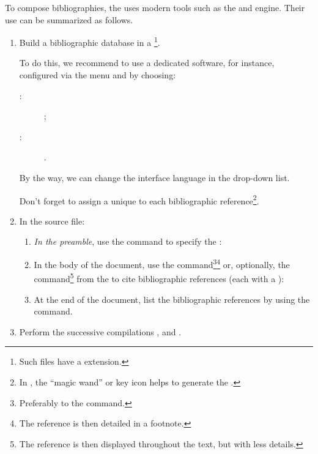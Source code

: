 \documentclass[english,nolocaltoc]{nwejmart}
\newtheorem[style=definition]{fact}
\newtheorem[title-plural=Criteria]{criterion}
\newtheorem[title=random experiment]{rexp}
\begin{document}
To compose bibliographies, the \nwejmauthorcl{} uses modern tools such
as the  and   engine. Their use can
be summarized as follows\autocite[for more details, see e.g.][in French]{Bitouze}.
\begin{enumerate}
\item Build a bibliographic database in a \footnote{Such
    files have a  extension.}.

  To do this, we recommend to use a dedicated software,
  \href{http://jabref.sourceforge.net/}{} for
  instance, configured via the menu
   and by choosing:
  \begin{description}
  \item[ :]  ;
  \item[ :] .
  \end{description}
  By the way, we can change the interface language in the
   drop-down list.

  Don't forget to assign a unique  to each bibliographic
  reference\footnote{In , the 
    \enquote{magic wand} or key icon helps to generate the  .}.
\item In the  source file: 
  \begin{enumerate}
  \item \emph{In the preamble}, use the 
    command to specify the :
\begin{preamblecode}[listing options={alsolanguage={[biblatex]TeX}}]
".bib}
\end{preamblecode}
  \item In the body of the document, use the 
    command\footnote{Preferably to the 
      command.}\footnote{The reference is then detailed in a
      footnote.}  or, optionally,  the 
    command\footnote{The reference is then displayed throughout the
      text, but with less details.} from the  to
    cite  bibliographic references (each with a ):
  \item At the end of the document, list the bibliographic
    references by using the  command.
  \end{enumerate}
\item Perform the successive compilations , 
  and 
  \suitecompilations.
\end{enumerate}
\end{document}
